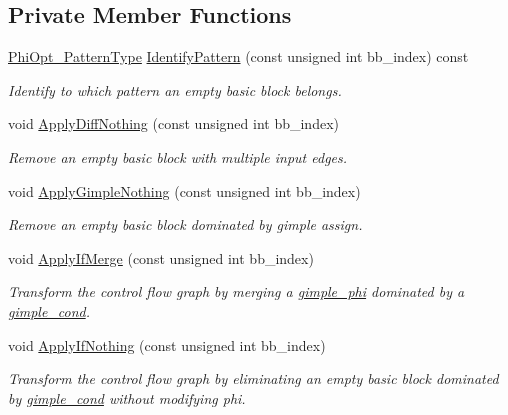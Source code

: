 \subsection*{Private Member Functions}
\begin{DoxyCompactItemize}
\item 
\hyperlink{phi__opt_8hpp_a56025cfe3e431d463931162e2d771f77}{Phi\+Opt\+\_\+\+Pattern\+Type} \hyperlink{classPhiOpt_a152f18a024bdfc6164aed9ad0cafe910}{Identify\+Pattern} (const unsigned int bb\+\_\+index) const
\begin{DoxyCompactList}\small\item\em Identify to which pattern an empty basic block belongs. \end{DoxyCompactList}\item 
void \hyperlink{classPhiOpt_a5d7228a841bc0ddd41c3bad7c338d7c2}{Apply\+Diff\+Nothing} (const unsigned int bb\+\_\+index)
\begin{DoxyCompactList}\small\item\em Remove an empty basic block with multiple input edges. \end{DoxyCompactList}\item 
void \hyperlink{classPhiOpt_a1bfa08060f3cb11d7c12163b4bd83e7d}{Apply\+Gimple\+Nothing} (const unsigned int bb\+\_\+index)
\begin{DoxyCompactList}\small\item\em Remove an empty basic block dominated by gimple assign. \end{DoxyCompactList}\item 
void \hyperlink{classPhiOpt_a3ad16335886d4b4ef6f00b7d4d087ff5}{Apply\+If\+Merge} (const unsigned int bb\+\_\+index)
\begin{DoxyCompactList}\small\item\em Transform the control flow graph by merging a \hyperlink{structgimple__phi}{gimple\+\_\+phi} dominated by a \hyperlink{structgimple__cond}{gimple\+\_\+cond}. \end{DoxyCompactList}\item 
void \hyperlink{classPhiOpt_af2d1a2083c7f247ec714dfc73ee38de0}{Apply\+If\+Nothing} (const unsigned int bb\+\_\+index)
\begin{DoxyCompactList}\small\item\em Transform the control flow graph by eliminating an empty basic block dominated by \hyperlink{structgimple__cond}{gimple\+\_\+cond} without modifying phi. \end{DoxyCompactList}\item 

\end{DoxyCompactItemize}
